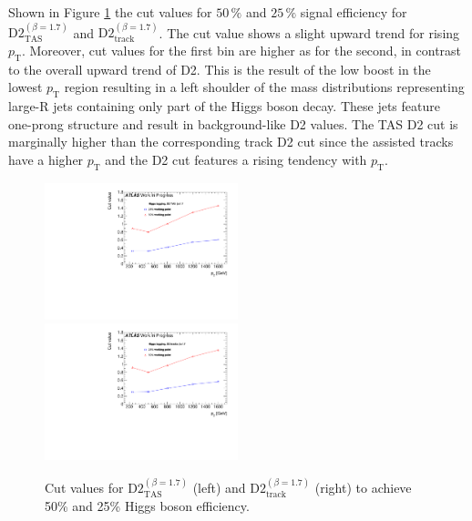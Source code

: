 Shown in Figure \ref{fig:higgs_cut} the cut values for $50\,\%$ and $25\,\%$ signal efficiency for $\text{D2}_{\text{TAS}}^{(\beta=1.7)}$ and $\text{D2}_{\text{track}}^{(\beta=1.7)}$. The cut value shows a slight upward trend for rising $p_{\mathrm{T}}$. Moreover, cut values for the first bin are higher as for the second, in contrast to the overall upward trend of D2. This is the result of the low boost in the lowest $p_{\mathrm{T}}$ region resulting in a left shoulder of the mass distributions representing large-R jets containing only part of the Higgs boson decay. These jets feature one-prong structure and result in background-like D2 values. The TAS D2 cut is marginally higher than the corresponding track D2 cut since the assisted tracks have a higher $p_{\mathrm{T}}$ and the D2 cut features a rising tendency with $p_{\mathrm{T}}$. 
\begin{figure}
\includegraphics[width=0.5\textwidth]{sascha_input/plots/Higgs/cut_value/d2_tas17.pdf} \hspace{1mm}
\includegraphics[width=0.5\textwidth]{sascha_input/plots/Higgs/cut_value/d2_tracks17.pdf}
\caption{\footnotesize{Cut values for $\text{D2}_{\text{TAS}}^{(\beta=1.7)}$ (left) and $\text{D2}_{\text{track}}^{(\beta=1.7)}$ (right) to achieve 50\% and 25\% Higgs boson efficiency.}}\label{fig:higgs_cut}
\end{figure}

